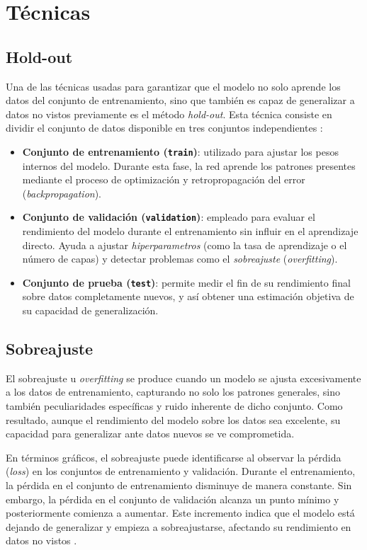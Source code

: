 \section{Técnicas}
\subsection{Hold-out}
Una de las técnicas usadas para garantizar que el modelo no solo aprende los datos del conjunto de entrenamiento, sino que también es capaz de generalizar a datos no vistos previamente es el método \textit{hold-out}. Esta técnica consiste en dividir el conjunto de datos disponible en tres conjuntos independientes \cite{deeplearning2016}:
\begin{itemize}
    \item \textbf{Conjunto de entrenamiento (\texttt{train})}: utilizado para ajustar los pesos internos del modelo. Durante esta fase, la red aprende los patrones presentes mediante el proceso de optimización y retropropagación del error (\textit{backpropagation}).
    \item \textbf{Conjunto de validación (\texttt{validation})}: empleado para evaluar el rendimiento del modelo durante el entrenamiento sin influir en el aprendizaje directo. Ayuda a ajustar \textit{hiperparametros} (como la tasa de aprendizaje o el número de capas) y detectar problemas como el \textit{sobreajuste} (\textit{overfitting}).
    \item \textbf{Conjunto de prueba (\texttt{test})}: permite medir el fin de su rendimiento final sobre datos completamente nuevos, y así obtener una estimación objetiva de su capacidad de generalización. 
\end{itemize}

\subsection{Sobreajuste}
El sobreajuste u \textit{overfitting} se produce cuando un modelo se ajusta excesivamente a los datos de entrenamiento, capturando no solo los patrones generales, sino también peculiaridades específicas y ruido inherente de dicho conjunto. Como resultado, aunque el rendimiento del modelo sobre los datos sea excelente, su capacidad para generalizar ante datos nuevos se ve comprometida. 

En términos gráficos, el sobreajuste puede identificarse al observar la pérdida (\textit{loss}) en los conjuntos de entrenamiento y validación. Durante el entrenamiento, la pérdida en el conjunto de entrenamiento disminuye de manera constante. Sin embargo, la pérdida en el conjunto de validación alcanza un punto mínimo y posteriormente comienza a aumentar. Este incremento indica que el modelo está dejando de generalizar y empieza a sobreajustarse, afectando su rendimiento en datos no vistos \cite{ying2019overfitting}.
